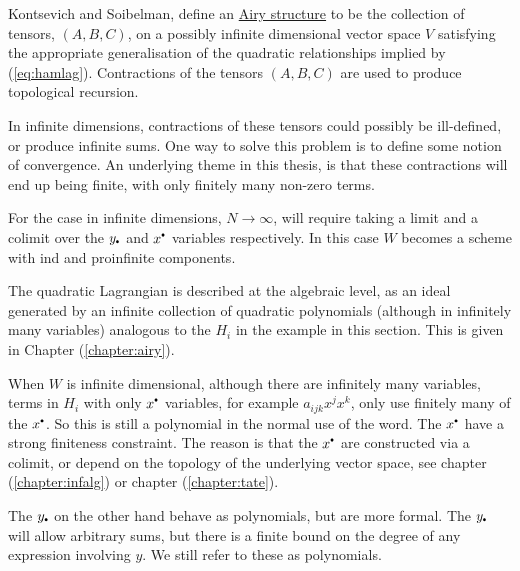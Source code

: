     Kontsevich and Soibelman, \cite{ks_airy, abcd, higherairy} define an \hyperref[defn:airystruct]{Airy structure} to be the collection of tensors, \((A,B,C)\), on a possibly infinite dimensional vector space \(V\)
    satisfying the appropriate generalisation of the quadratic relationships implied by (\ref{eq:hamlag}). Contractions of the tensors \((A,B,C)\) are used to produce topological recursion.
    
    \begin{rem} 
    In infinite dimensions, contractions of these tensors could possibly be ill-defined, or produce infinite sums. One way to solve this problem is to define some notion of convergence. An underlying theme in this thesis, is that these contractions will end up being finite, with only finitely many non-zero terms. 
    \end{rem}
    
    
    For the case in infinite dimensions, \( N \rightarrow \infty\), will require taking a limit and a colimit over the \(y_{\sbt}\) and \( x^{\sbt}\) variables respectively.  In this case \(W\) becomes a scheme with ind and proinfinite components.
    
    
    The quadratic Lagrangian is described at the algebraic level, as an ideal generated by an infinite collection of quadratic polynomials (although in infinitely many variables) analogous to the \( H_i\) in the example in this section. This is given in Chapter (\ref{chapter:airy}). 
    
    \begin{rem} When \(W\) is infinite dimensional, although there are infinitely many variables, terms in \(H_i\) with only \(x^{\sbt}\) variables, for example \( a_{ijk}x^j x^k\), only use finitely many of the \(x^{\sbt}\). So this is still a polynomial in the normal use of the word. The \(x^{\sbt}\) have a strong finiteness constraint. The reason is that the \(x^{\sbt}\) are constructed via a colimit, or depend on the topology of the underlying vector space, see chapter (\ref{chapter:infalg}) or chapter (\ref{chapter:tate}).
    
    The \(y_{\sbt}\) on the other hand behave as polynomials, but are more formal. The \(y_{\sbt}\) will allow arbitrary sums, but there is a finite bound on the degree of any expression involving \(y\). We still refer to these as polynomials.
    \end{rem}
    
